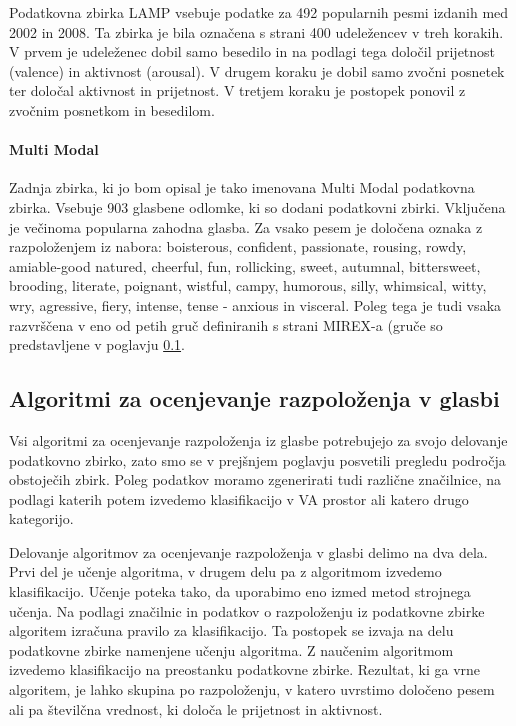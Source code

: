 \documentclass[a4paper, 12pt]{book}
\begin{document}
{Podatkovna zbirka LAMP \cite{chu2010lamp} vsebuje podatke za 492 popularnih pesmi izdanih med 2002 in 2008. Ta zbirka je bila označena s strani 400 udeležencev v treh korakih. V prvem je udeleženec dobil samo besedilo in  na podlagi tega določil prijetnost (valence) in aktivnost (arousal). V drugem koraku je dobil samo zvočni posnetek ter določal aktivnost in prijetnost. V tretjem koraku je postopek ponovil z zvočnim posnetkom in besedilom.

\paragraph{Multi Modal}

Zadnja zbirka, ki jo bom opisal je tako imenovana Multi Modal \cite{panda2013multi} podatkovna zbirka. Vsebuje 903 glasbene odlomke, ki so dodani podatkovni zbirki. Vključena je večinoma popularna zahodna glasba. Za vsako pesem je določena oznaka z razpoloženjem iz nabora: boisterous, confident, passionate, rousing, rowdy, amiable-good natured, cheerful, fun, rollicking, sweet, autumnal, bittersweet, brooding, literate, poignant, wistful, campy, humorous, silly, whimsical, witty, wry, agressive, fiery, intense, tense - anxious in visceral. Poleg tega je tudi vsaka razvrščena v eno od petih gruč definiranih s strani MIREX-a (gruče so predstavljene v poglavju \ref{algoritmisp}. 

\subsection{Algoritmi za ocenjevanje razpoloženja v glasbi} 
\label{algoritmisp}

Vsi algoritmi za ocenjevanje razpoloženja iz glasbe potrebujejo za svojo delovanje podatkovno zbirko, zato smo se v prejšnjem poglavju posvetili pregledu področja obstoječih zbirk. Poleg podatkov moramo zgenerirati tudi različne značilnice, na podlagi katerih potem izvedemo klasifikacijo v VA prostor ali katero drugo kategorijo.

Delovanje algoritmov za ocenjevanje razpoloženja v glasbi delimo na dva dela. Prvi del je učenje algoritma, v drugem delu pa z algoritmom  izvedemo klasifikacijo. Učenje poteka tako, da uporabimo eno izmed metod strojnega učenja. Na podlagi značilnic in podatkov o razpoloženju iz podatkovne zbirke algoritem izračuna pravilo za klasifikacijo. Ta postopek se izvaja na delu podatkovne zbirke namenjene učenju algoritma. Z naučenim algoritmom izvedemo klasifikacijo na preostanku podatkovne zbirke. Rezultat, ki ga vrne algoritem, je lahko skupina po razpoloženju, v katero uvrstimo določeno pesem ali pa številčna vrednost, ki določa le prijetnost in aktivnost.

}
\end{document}
